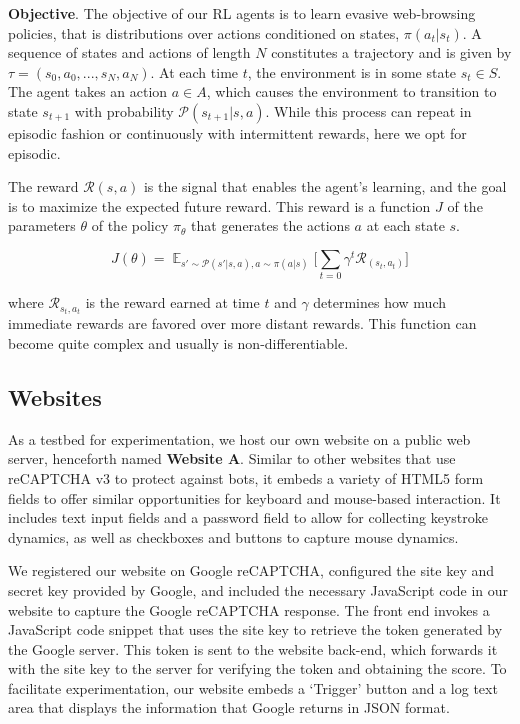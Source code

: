 \textbf{Objective}. The objective of our \gls{RL} agents is to learn evasive web-browsing policies, that is distributions over actions conditioned on states, $\pi(a_t|s_t)$.
A sequence of states and actions of length $N$ constitutes a trajectory and is given by $\tau = (s_0, a_0, . . . , s_N, a_N)$.
At each time $t$, the environment is in some state $s_t \in S$.
The agent takes an action $a \in A$, which causes the environment to transition to state $s_{t+1}$ with probability $\mathcal{P}(s_{t+1}|s,a)$.
While this process can repeat in episodic fashion or continuously with intermittent rewards, here we opt for episodic.

The reward $\mathcal{R}(s,a)$ is the signal that enables the agent's learning, and the goal is to maximize the expected future reward.
This reward is a function $J$ of the parameters $\theta$ of the policy $\pi _{\theta}$ that generates the actions $a$ at each state $s$.

\begin{equation}
J(\theta)=\mathop{\mathbb{E}}_{s'\sim \mathcal{P}(s'|s,a), a\sim \pi (a|s)}\bigg[\sum _{t=0}\gamma ^{t}\mathcal{R}_(s_t, a_t)\bigg]
\end{equation}

where $\mathcal{R}_{s_t, a_t}$ is the reward earned at time $t$ and $\gamma$ determines how much immediate rewards are favored over more distant rewards.
This function can become quite complex and usually is non-differentiable.

\subsection{Websites}

As a testbed for experimentation, we host our own website on a public web server, henceforth named \textbf{Website A}.
Similar to other websites that use reCAPTCHA v3 to protect against bots, it embeds a variety of HTML5 form fields to offer similar opportunities for keyboard and mouse-based interaction.
It includes text input fields and a password field to allow for collecting keystroke dynamics, as well as checkboxes and buttons to capture mouse dynamics.

We registered our website on Google reCAPTCHA, configured the site key and secret key provided by Google, and included the necessary JavaScript code in our website to capture the Google reCAPTCHA response.
The front end invokes a JavaScript code snippet that uses the site key to retrieve the token generated by the Google server.
This token is sent to the website back-end, which forwards it with the site key to the server for verifying the token and obtaining the score.
To facilitate experimentation, our website embeds a `Trigger' button and a log text area that displays the information that Google returns in JSON format.

